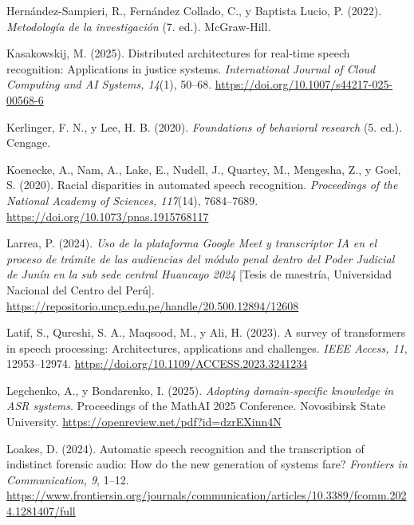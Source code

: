 \documentclass[12pt,a4paper,oneside]{report}
\begin{document}
\vspace{6pt}
Hernández-Sampieri, R., Fernández Collado, C., y Baptista Lucio, P. (2022). \textit{Metodología de la investigación} (7.\textordfeminine{} ed.). McGraw-Hill.

\vspace{6pt}
Kasakowskij, M. (2025). Distributed architectures for real-time speech recognition: Applications in justice systems. \textit{International Journal of Cloud Computing and AI Systems, 14}(1), 50--68. \url{https://doi.org/10.1007/s44217-025-00568-6}

\vspace{6pt}
Kerlinger, F. N., y Lee, H. B. (2020). \textit{Foundations of behavioral research} (5.\textordfeminine{} ed.). Cengage.

\vspace{6pt}
Koenecke, A., Nam, A., Lake, E., Nudell, J., Quartey, M., Mengesha, Z., y Goel, S. (2020). Racial disparities in automated speech recognition. \textit{Proceedings of the National Academy of Sciences, 117}(14), 7684--7689. \url{https://doi.org/10.1073/pnas.1915768117}

\vspace{6pt}
Larrea, P. (2024). \textit{Uso de la plataforma Google Meet y transcriptor IA en el proceso de trámite de las audiencias del módulo penal dentro del Poder Judicial de Junín en la sub sede central Huancayo 2024} [Tesis de maestría, Universidad Nacional del Centro del Perú]. \url{https://repositorio.uncp.edu.pe/handle/20.500.12894/12608}

\vspace{6pt}
Latif, S., Qureshi, S. A., Maqsood, M., y Ali, H. (2023). A survey of transformers in speech processing: Architectures, applications and challenges. \textit{IEEE Access, 11}, 12953--12974. \url{https://doi.org/10.1109/ACCESS.2023.3241234}

\vspace{6pt}
Legchenko, A., y Bondarenko, I. (2025). \textit{Adopting domain-specific knowledge in ASR systems}. Proceedings of the MathAI 2025 Conference. Novosibirsk State University. \url{https://openreview.net/pdf?id=dzrEXinn4N}

\vspace{6pt}
Loakes, D. (2024). Automatic speech recognition and the transcription of indistinct forensic audio: How do the new generation of systems fare? \textit{Frontiers in Communication, 9}, 1--12. \url{https://www.frontiersin.org/journals/communication/articles/10.3389/fcomm.2024.1281407/full}
\end{document}
